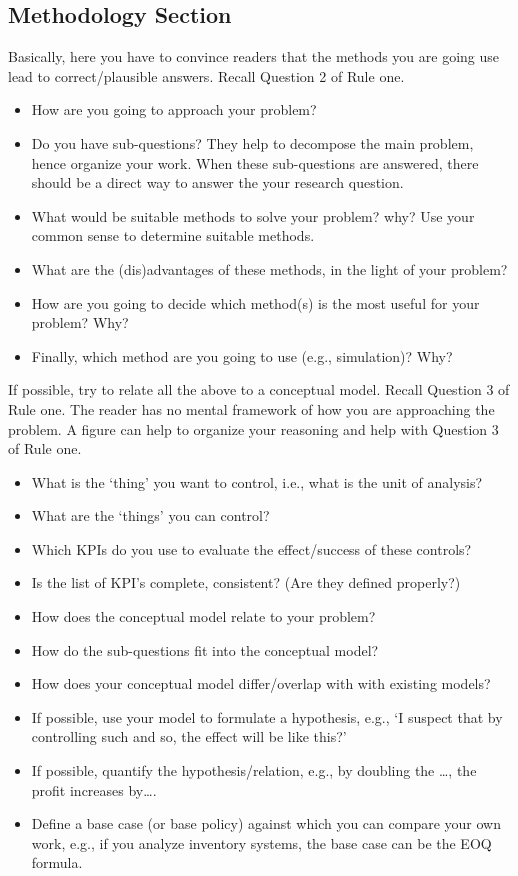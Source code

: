 \documentclass{article}
\begin{document}
\subsection{Methodology Section}
\label{sec:methods-section}

Basically, here you have to convince readers that the methods you are
going use lead to correct/plausible answers. Recall Question 2 of Rule one.

\begin{itemize}
\item How are you going to approach your problem?
\item Do you have sub-questions? They help to decompose the main
  problem, hence organize your work. When these sub-questions are
  answered, there should be a direct way to answer the your research
  question. 
\item What would be suitable methods to solve your problem? why? Use
  your common sense to determine suitable methods.
\item What are the (dis)advantages of these methods, in the light of
  your problem?
\item How are you going to decide which method(s) is the most useful for your problem? Why?
\item Finally, which method are you going to use (e.g., simulation)?
  Why?
\end{itemize}

If possible, try to relate all the above to a conceptual model. Recall
Question 3 of Rule one. The reader has no mental framework of how you
are approaching the problem. A figure can help to organize your
reasoning and help with Question 3 of Rule one.

\begin{itemize}
\item What is the `thing' you want to control, i.e., what is the unit of analysis?
\item What are the `things' you can control? 
\item Which KPIs do you use to  evaluate the effect/success of these controls?
\item Is the list of KPI's complete, consistent? (Are they defined properly?)
\item How does the conceptual model relate to your problem? 
\item How do the sub-questions fit into the conceptual model?
\item How does your conceptual model differ/overlap with with existing
  models?
\item If possible, use your model to formulate a hypothesis, e.g., `I
  suspect that by controlling such and so, the effect will be like
  this?'
\item If possible, quantify the hypothesis/relation, e.g., by
  doubling the \ldots, the profit increases by\ldots.
\item Define a base case (or base policy) against which you can
  compare your own work, e.g., if you analyze inventory systems, the
  base case can be the EOQ formula.
\end{itemize}
\end{document}
